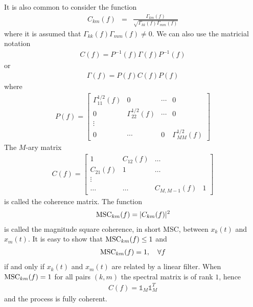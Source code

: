 It is also common to consider the function
\begin{eqnarray}
\label{eq:correlationcoherence}
 C_{km}(f)
 &=&\frac{\Gamma_{km}(f)}{\sqrt{\Gamma_{kk}(f)\Gamma_{mm}(f)}}
\end{eqnarray}
where it is assumed that $\Gamma_{kk}(f)\Gamma_{mm}(f)\neq 0$. We can also use the matricial notation
\begin{eqnarray}
 \label{eq:def-generalMSC}
  C(f) = P^{-1}(f)  \Gamma(f) P^{-1}(f)
\end{eqnarray}
or
\begin{eqnarray}
 \label{eq:reverse-def-generalMSC}
  \Gamma(f) = P(f) C(f) P(f)
\end{eqnarray}
where
\begin{eqnarray}
  \label{eq:spectral-content}
 P(f) =   \begin{bmatrix}
  \Gamma_{11}^{1/2}(f)&0&\cdots&0
  \\
  0&\Gamma_{22}^{1/2}(f)&\cdots&0
  \\
  \vdots
  \\
  0&\cdots&0&\Gamma_{MM}^{1/2}(f)
  \end{bmatrix}
\end{eqnarray}
The $M$-ary matrix
\begin{eqnarray}
 \label{eq:coherence-matrix}
 C(f)=\begin{bmatrix}
1&C_{12}(f)&\ldots\\
C_{21}(f)&1& \ldots\\
\vdots\\
\ldots&\ldots&C_{M,M-1}(f)&1
\end{bmatrix}
\end{eqnarray}
is called the coherence matrix. The  function 
\begin{eqnarray}
 \label{eq:def-coherence-function}
 \mathrm{MSC}_{km}(f)=|C_{km}(f)|^{2}
\end{eqnarray}
is called the magnitude square coherence, in short MSC, between $x_{k}(t)$ and $x_{m}(t)$. 
It is easy to show that $\mathrm{MSC}_{km}(f)\leq 1$ and
\begin{eqnarray}
 \label{eq:rhomlfeq1}
 \mathrm{MSC}_{km}(f)=1,\quad \forall f
\end{eqnarray}
if and only if $x_{k}(t)$ and $x_{m}(t)$ are related by a linear filter. When $\mathrm{MSC}_{km}(f)=1$ for all pairs $(k,m)$ the spectral matrix is of rank $1$, hence 
\begin{eqnarray}
C(f)={\mathds 1}_M{\mathds 1}_M^T
\end{eqnarray}
and the process is fully coherent. 

